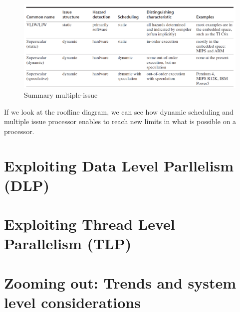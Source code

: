 \documentclass{report}
\begin{document}
\begin{figure}[H]
    \centering
    \includegraphics[width=0.8\linewidth]{summary_multiple_issue.png}
    \caption{Summary multiple-issue}
    \label{fig:enter-label}
\end{figure}

If we look at the roofline diagram, we can see how dynamic scheduling and multiple issue processor enables to reach new limits in what is possible on a processor.

\chapter{Exploiting Data Level Parllelism (DLP)}
\chapter{Exploiting Thread Level Parallelism (TLP)}
\chapter{Zooming out: Trends and system level considerations}
\end{document}
